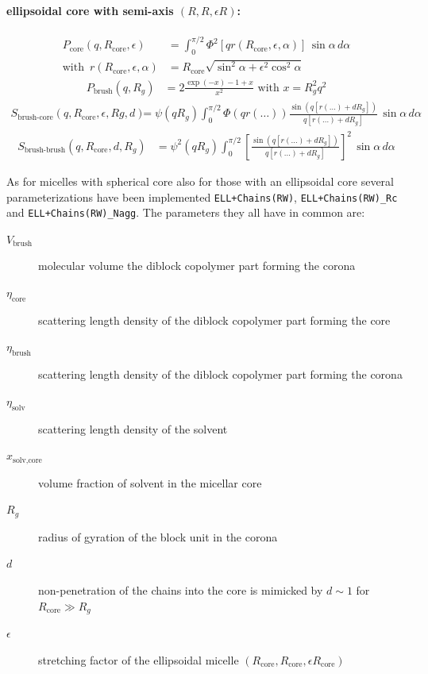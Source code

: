 \clearpage
\noindent\paragraph{ellipsoidal core with
semi-axis $(R,R,\epsilon R)$:}
\begin{align}
P_\text{core}(q,R_\text{core},\epsilon) &= \int_0^{\pi/2}\Phi^2[qr(R_\text{core},\epsilon,\alpha)] \, \sin\alpha \, d\alpha \\
\text{with~} \, r(R_\text{core},\epsilon,\alpha) &= R_\text{core}\sqrt{\sin^2\alpha+\epsilon^2\cos^2\alpha} \nonumber
\end{align}
\begin{align}
P_\text{brush}(q,R_g)&= 2\frac{\exp(-x)-1+x}{x^2} \text{~with~} x = R_g^2q^2
\end{align}
\begin{align}
S_\text{brush-core}(q,R_\text{core},\epsilon,Rg,d) &=
        \psi(qR_g)\int_0^{\pi/2} \Phi(qr(\dots))\frac{\sin(q[r(\dots)+dR_g])}{q[r(\dots)+dR_g]} \, \sin\alpha \, d\alpha
\end{align}
\begin{align}
S_\text{brush-brush}(q,R_\text{core},d,R_g) &= \psi^2(qR_g) \int_0^{\pi/2}\left[\frac{\sin(q[r(\dots)+dR_g])}{q[r(\dots)+dR_g]}\right]^2 \, \sin\alpha \, d\alpha
\end{align}

\noindent
As for micelles with spherical core also for those with an ellipsoidal core several
parameterizations have been implemented \texttt{ELL+Chains(RW)}, \texttt{ELL+Chains(RW)\_Rc} and
\texttt{ELL+Chains(RW)\_Nagg}. \sloppy
The parameters they all have in common are:
\begin{description}
\item[$V_\text{brush}$] molecular volume the diblock copolymer part forming the corona
\item[$\eta_\text{core}$] scattering length density of the diblock copolymer part forming the core
\item[$\eta_\text{brush}$] scattering length density of the diblock copolymer part forming the corona
\item[$\eta_\text{solv}$] scattering length density of the solvent
\item[$x_\text{solv,core}$] volume fraction of solvent in the micellar core
\item[$R_g$] radius of gyration of the block unit in the corona
\item[$d$]  non-penetration of the chains into the core is mimicked by
$d\sim 1$ for $R_\text{core}\gg R_g$
\item[$\epsilon$] stretching factor of the ellipsoidal micelle $(R_\text{core},R_\text{core},\epsilon R_\text{core})$
\end{description}

